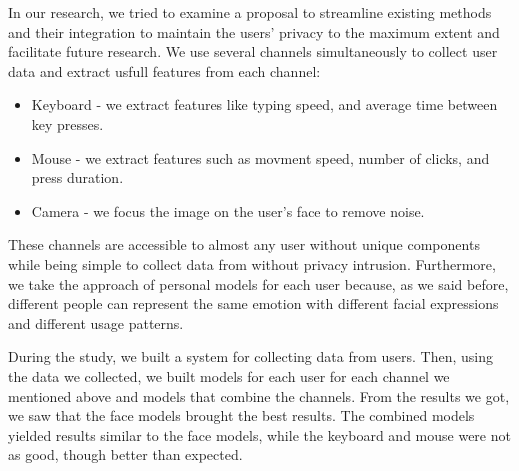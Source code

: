 In our research, we tried to examine a proposal to streamline existing methods and their integration to maintain the users' 
privacy to the maximum extent and facilitate future research. We use several channels simultaneously to collect user data and extract 
usfull features from each channel:

\begin{itemize}
    \item Keyboard - we extract features like typing speed, and average time between key presses.
    \item Mouse - we extract features such as movment speed, number of clicks, and press duration.
    \item Camera - we focus the image on the user’s face to remove noise.  
\end{itemize}

These channels are accessible to almost any user without unique components while being simple to collect data from without privacy intrusion. 
Furthermore, we take the approach of personal models for each user because, as we said before, different people can represent the same emotion 
with different facial expressions and different usage patterns.

During the study, we built a system for collecting data from users. 
Then, using the data we collected, we built models for each user for each channel we mentioned above and models that combine the channels. 
From the results we got, we saw that the face models brought the best results. The combined models yielded results similar to the face models,
while the keyboard and mouse were not as good, though better than expected.

